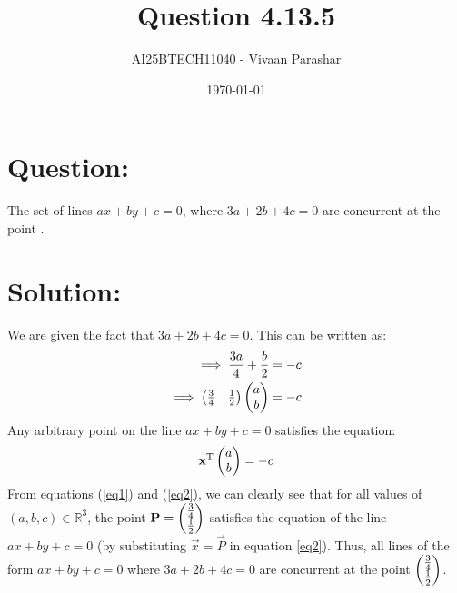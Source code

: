 \documentclass[a4paper, 12pt]{article}
\title{Question 4.13.5}
\author{AI25BTECH11040 - Vivaan Parashar}
\date{\today}
\begin{document}
\maketitle

\section{Question: }
The set of lines $ax + by + c = 0$, where $3a + 2b + 4c = 0$ are concurrent at the point \underline{\hspace{2cm}}.

\section{Solution: }
We are given the fact that $3a + 2b + 4c = 0$. This can be written as:
\begin{align}
    \implies \frac{3a}{4} + \frac{b}{2} = -c\\
    \implies \begin{pmatrix}\frac{3}{4} & \frac{1}{2}\end{pmatrix} \begin{pmatrix}a \\ b\end{pmatrix} = -c \label{eq1}
\end{align}
Any arbitrary point on the line $ax + by + c = 0$ satisfies the equation:
\begin{align}
    \mathbf{x}^\mathrm{T} \begin{pmatrix}a \\ b\end{pmatrix} = -c \label{eq2}
\end{align}
From equations (\ref{eq1}) and (\ref{eq2}), we can clearly see that for all values of $(a, b, c) \in \mathbb{R}^3$, the point $\mathbf{P} = \begin{pmatrix}\frac{3}{4} \\ \frac{1}{2}\end{pmatrix}$ satisfies the equation of the line $ax + by + c = 0$ (by substituting $\vec{x} = \vec{P}$ in equation \ref{eq2}). Thus, all lines of the form $ax + by + c = 0$ where $3a + 2b + 4c = 0$ are concurrent at the point $\begin{pmatrix}\frac{3}{4} \\ \frac{1}{2}\end{pmatrix}$.
\end{document}
